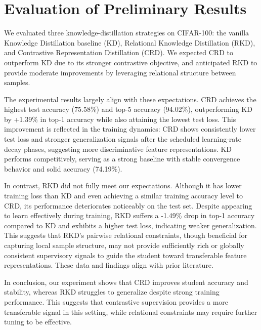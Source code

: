 \documentclass{article}
\begin{document}
\section{Evaluation of Preliminary Results}

We evaluated three knowledge-distillation strategies on CIFAR-100: the vanilla Knowledge Distillation baseline (KD), Relational Knowledge Distillation (RKD), and Contrastive Representation Distillation (CRD). We expected CRD to outperform KD due to its stronger contrastive objective, and anticipated RKD to provide moderate improvements by leveraging relational structure between samples.

The experimental results largely align with these expectations. CRD achieves the highest test accuracy (75.58\%) and top-5 accuracy (94.02\%), outperforming KD by +1.39\% in top-1 accuracy while also attaining the lowest test loss. This improvement is reflected in the training dynamics: CRD shows consistently lower test loss and stronger generalization signals after the scheduled learning-rate decay phases, suggesting more discriminative feature representations. KD performs competitively, serving as a strong baseline with stable convergence behavior and solid accuracy (74.19\%). 

In contrast, RKD did not fully meet our expectations. Although it has lower training loss than KD and even achieving a similar training accuracy level to CRD, its performance deteriorates noticeably on the test set. Despite appearing to learn effectively during training, RKD suffers a -1.49\% drop in top-1 accuracy compared to KD and exhibits a higher test loss, indicating weaker generalization. This suggests that RKD's pairwise relational constraints, though beneficial for capturing local sample structure, may not provide sufficiently rich or globally consistent supervisory signals to guide the student toward transferable feature representations. These data and findings align with prior literature. \citep{crd_tian2022contrastiverepresentationdistillation}

In conclusion, our experiment shows that CRD improves student accuracy and stability, whereas RKD struggles to generalize despite strong training performance. This suggests that contrastive supervision provides a more transferable signal in this setting, while relational constraints may require further tuning to be effective.
\end{document}
